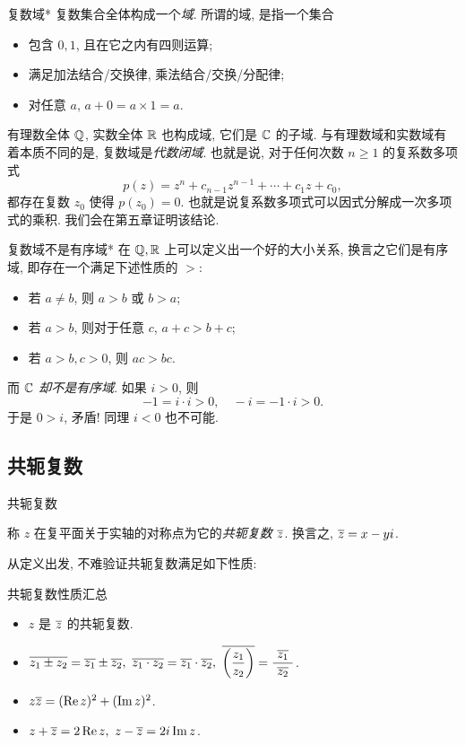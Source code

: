 \begin{frame}{复数域*}
\onslide<+->复数集合全体构成一个\emph{域}.
\onslide<+->所谓的域, 是指一个集合
\begin{itemize}
\item 包含 $0,1$, 且在它之内有四则运算;
\item 满足加法结合/交换律, 乘法结合/交换/分配律;
\item 对任意 $a$, $a+0=a\times 1=a$.
\end{itemize}
\onslide<+->有理数全体 ${\mathbb{Q}}$, 实数全体 ${\mathbb{R}}$ 也构成域, 它们是 ${\mathbb{C}}$ 的子域.
\onslide<+->与有理数域和实数域有着本质不同的是, 复数域是\emph{代数闭域}.
\onslide<+->也就是说, 对于任何次数 $n\ge 1$ 的复系数多项式
	\[p(z)=z^n+c_{n-1}z^{n-1}+\cdots+c_1z+c_0,\]
\onslide<+->都存在复数 $z_0$ 使得 $p(z_0)=0$.
\onslide<+->也就是说复系数多项式可以因式分解成一次多项式的乘积.
\onslide<+->我们会在第五章证明该结论.
\end{frame}


\begin{frame}{复数域不是有序域*}
\onslide<+->在 ${\mathbb{Q}},{\mathbb{R}}$ 上可以定义出一个好的大小关系,
\onslide<+->换言之它们是有序域, 即存在一个满足下述性质的 $>$:
\begin{itemize}
\item 若 $a\neq b$, 则 $a>b$ 或 $b>a$;
\item 若 $a>b$, 则对于任意 $c$, $a+c>b+c$;
\item 若 $a>b,c>0$, 则 $ac>bc$.
\end{itemize}
\onslide<+->而 \emph{${\mathbb{C}}$ 却不是有序域}.
\onslide<+->如果 $i>0$, 则
	\[-1=i\cdot i>0,\quad -i=-1\cdot i>0.\]
\onslide<+->于是 $0>i$, 矛盾! 同理 $i<0$ 也不可能.
\end{frame}


\subsection{共轭复数}

\begin{frame}{共轭复数}
\onslide<+->
\begin{definition}
称 $z$ 在复平面关于实轴的对称点为它的\emph{共轭复数 $\overline z$}.
换言之, $\overline z=x-yi$.
\end{definition}
\onslide<+->从定义出发, 不难验证共轭复数满足如下性质:
\onslide<+->
\begin{block}{共轭复数性质汇总}
\begin{itemize}
\item $z$ 是 $\overline z$ 的共轭复数.
\item $\ov{z_1\pm z_2}=\ov{z_1}\pm\ov{z_2},\ 
\ov{z_1\cdot z_2}=\ov{z_1}\cdot\ov{z_2},\ 
\ov{\left(\dfrac{z_1}{z_2}\right)}=\dfrac{~\ov{z_1}~}{\ov{z_2}}$.
\item $z\overline{z}=(\operatorname{Re} z)^2+(\operatorname{Im} z)^2$.
\item $z+\overline z=2\operatorname{Re} z,\ z-\overline z=2i\operatorname{Im} z$.
\end{itemize}
\end{block}
\end{frame}


